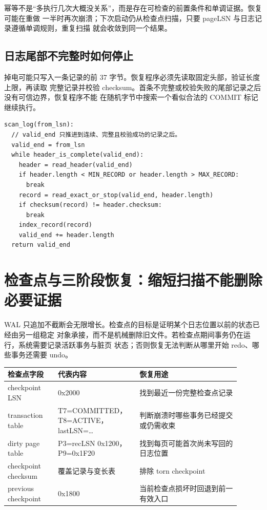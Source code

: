 幂等不是“多执行几次大概没关系”，而是存在可检查的前置条件和单调证据。恢复可能在重做
一半时再次崩溃；下次启动仍从检查点扫描，只要 pageLSN 与日志记录遵循单调规则，重复扫描
就会收敛到同一个结果。

\subsection{日志尾部不完整时如何停止}

掉电可能只写入一条记录的前 37 字节。恢复程序必须先读取固定头部，验证长度上限，再读取
完整记录并校验 checksum。首条不完整或校验失败的尾部记录之后没有可信边界，恢复程序不能
在随机字节中搜索一个看似合法的 COMMIT 标记继续执行。

\begin{lstlisting}
scan_log(from_lsn):
  // valid_end 只推进到连续、完整且校验成功的记录之后。
  valid_end = from_lsn
  while header_is_complete(valid_end):
    header = read_header(valid_end)
    if header.length < MIN_RECORD or header.length > MAX_RECORD:
      break
    record = read_exact_or_stop(valid_end, header.length)
    if checksum(record) != header.checksum:
      break
    index_record(record)
    valid_end += header.length
  return valid_end
\end{lstlisting}

\section{检查点与三阶段恢复：缩短扫描不能删除必要证据}

WAL 只追加不截断会无限增长。检查点的目标是证明某个日志位置以前的状态已经由另一组稳定
对象承接，而不是机械删除旧文件。若检查点期间事务仍在运行，系统需要记录活跃事务与脏页
状态；否则恢复无法判断从哪里开始 redo、哪些事务还需要 undo。

\begin{longtable}{|L{0.2\linewidth}|L{0.3\linewidth}|L{0.4\linewidth}|}
\hline
检查点字段 & 代表内容 & 恢复用途 \\ \hline
checkpoint LSN & 0x2000 & 找到最近一份完整检查点记录 \\\tablerowrule
transaction table & T7=COMMITTED，T8=ACTIVE，lastLSN=… &
判断崩溃时哪些事务已经提交或仍需收束 \\\tablerowrule
dirty page table & P3=recLSN 0x1200，P9=0x1F20 &
找到每页可能首次尚未写回的日志位置 \\\tablerowrule
checkpoint checksum & 覆盖记录与变长表 & 排除 torn checkpoint \\\tablerowrule
previous checkpoint & 0x1800 & 当前检查点损坏时回退到前一有效入口 \\
\hline
\end{longtable}

